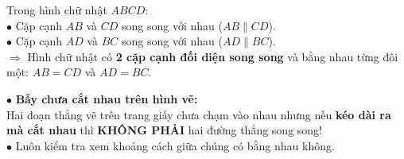 \documentclass[14pt,a4paper,oneside]{extbook}
\begin{document}
\vspace{2mm}

\noindent
\begin{minipage}[t]{0.53\textwidth}
  \begin{tcolorbox}[
    enhanced,
    title={\footnotesize\bfseries\color{white}\faCheckCircle\ Ví dụ thực hành chuẩn mực},
    colback=green!2!white,
    colframe=green!60!black,
    arc=2.5mm, boxrule=0.8pt, top=1.8mm, bottom=1.8mm, left=2.2mm, right=2.2mm
  ]
    \footnotesize
    Trong hình chữ nhật $ABCD$:\\
    $\bullet$ Cặp cạnh $AB$ và $CD$ song song với nhau ($AB \parallel CD$).\\
    $\bullet$ Cặp cạnh $AD$ và $BC$ song song với nhau ($AD \parallel BC$).\\
    $\Rightarrow$ Hình chữ nhật có \textbf{2 cặp cạnh đối diện song song} và bằng nhau từng đôi một: $AB = CD$ và $AD = BC$.
  \end{tcolorbox}
\end{minipage}%
\hfill
\begin{minipage}[t]{0.45\textwidth}
  \begin{tcolorbox}[
    enhanced,
    title={\footnotesize\bfseries\color{white}\faExclamationTriangle\ Mẹo tránh bẫy trắc nghiệm},
    colback=red!2!white,
    colframe=red!70!black,
    arc=2.5mm, boxrule=0.8pt, top=1.8mm, bottom=1.8mm, left=2.2mm, right=2.2mm
  ]
    \footnotesize
    $\bullet$ \textbf{Bẫy chưa cắt nhau trên hình vẽ:}\\
    Hai đoạn thẳng vẽ trên trang giấy chưa chạm vào nhau nhưng nếu \textbf{kéo dài ra mà cắt nhau} thì \textbf{KHÔNG PHẢI} hai đường thẳng song song!\\
    $\bullet$ Luôn kiểm tra xem khoảng cách giữa chúng có bằng nhau không.
  \end{tcolorbox}
\end{minipage}
\end{document}
